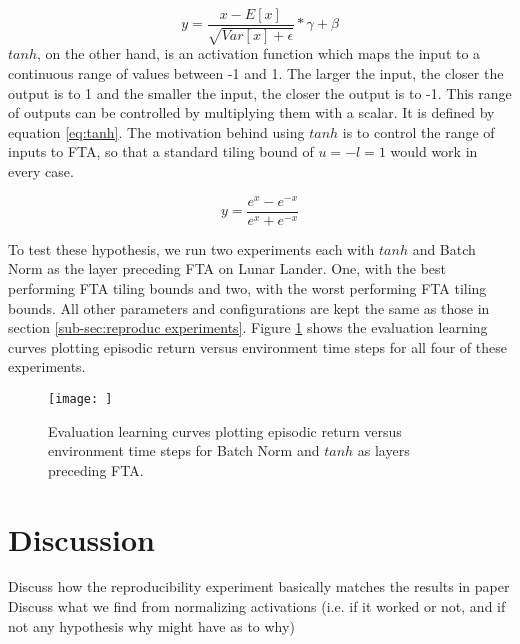 \documentclass{article}
\begin{document}
\begin{equation}
    y = \frac{x-E[x]}{\sqrt{Var[x] + \epsilon}} * \gamma + \beta
    \label{eq:batchnorm}
\end{equation}
 $tanh$, on the other hand, is an activation function which maps the input to a continuous range of values between -1 and 1. The larger the input, the closer the output is to 1 and the smaller the input, the closer the output is to -1. This range of outputs can be controlled by multiplying them with a scalar. It is defined by equation \ref{eq:tanh}. The motivation behind using $tanh$ is to control the range of inputs to FTA, so that a standard tiling bound of $u = -l = 1$ would work in every case.

 \begin{equation}
    y = \frac{e^x-e^{-x}}{e^x+e^{-x}}
    \label{eq:tanh}
 \end{equation}

To test these hypothesis, we run two experiments each with $tanh$ and Batch Norm as the layer preceding FTA on Lunar Lander. One, with the best performing FTA tiling bounds and two, with the worst performing FTA tiling bounds. All other parameters and configurations are kept the same as those in section \ref{sub-sec:reproduc experiments}. Figure \ref{fig:bnvtanh} shows the evaluation learning curves plotting episodic return versus environment time steps for all four of these experiments.

\begin{figure}[h]
    \centering
    \texttt{[image: ]}
    \caption{Evaluation learning curves plotting episodic return versus environment time steps for Batch Norm and $tanh$ as layers preceding FTA.}
    \label{fig:bnvtanh}
\end{figure}


\section{Discussion} \label{sec:discussion}
Discuss how the reproducibility experiment basically matches the results in \cite[]{pan2019fuzzy} paper
Discuss what we find from normalizing activations (i.e. if it worked or not, and if not any hypothesis why might have as to why)


\newpage

\end{document}
